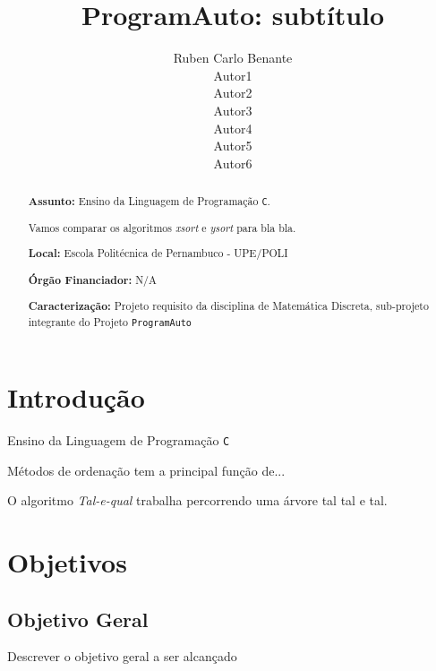 \documentclass[a4paper,10pt]{article}  %
\title{ProgramAuto: subtítulo}
\author{Ruben Carlo Benante \\ Autor1 \\ Autor2 \\ Autor3 \\ Autor4 \\ Autor5 \\ Autor6 }
\begin{document}

\maketitle


\begin{abstract}

\textbf{Assunto:} Ensino da Linguagem de Programação \texttt{C}.

Vamos comparar os algoritmos \textit{xsort} e \textit{ysort} para bla bla.

\textbf{Local:} Escola Politécnica de Pernambuco - UPE/POLI

\textbf{Órgão Financiador:} N/A

\textbf{Caracterização:} Projeto requisito da disciplina de Matemática Discreta, sub-projeto integrante do Projeto \texttt{ProgramAuto}


\end{abstract}



\section{Introdução}


Ensino da Linguagem de Programação \texttt{C}

Métodos de ordenação tem a principal função de...


O algoritmo \textit{Tal-e-qual} trabalha percorrendo uma árvore tal tal e tal.

\section{Objetivos}

\subsection{Objetivo Geral}

Descrever o objetivo geral a ser alcançado
\end{document}
